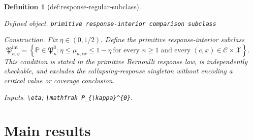 \documentclass{article}
\newtheorem{definition}{Definition}
\begin{document}
\begin{definition}[def:response-regular-subclass]\label{def:response-regular-subclass}
\par\smallskip\noindent\emph{Defined object.} \texttt{primitive response-\allowbreak{}interior comparison subclass}
\par\smallskip\noindent\emph{Construction.} Fix \(\eta\in(0,1/2)\).  Define the primitive response-interior subclass
\[
\mathfrak P_{\kappa,\eta}^{\mathrm{int}}
=\left\{\mathbb P\in\mathfrak P_{\kappa}^{0}:
\eta\leq\mu_{n,cx}\leq1-\eta
\ \text{for every }n\geq1\text{ and every }(c,x)\in\mathcal C\times\mathcal X
\right\}.
\]
This condition is stated in the primitive Bernoulli response law, is independently checkable, and excludes the collapsing-response singleton without encoding a critical value or coverage conclusion.
\par\smallskip\noindent\emph{Inputs.} \texttt{\textbackslash{}\allowbreak{}eta}; \texttt{\textbackslash{}\allowbreak{}mathfrak P\_\allowbreak{}\{\textbackslash{}\allowbreak{}kappa\}\allowbreak{}\textasciicircum{}\{0\}\allowbreak{}}.
\end{definition}

\section{Main results}
\end{document}
